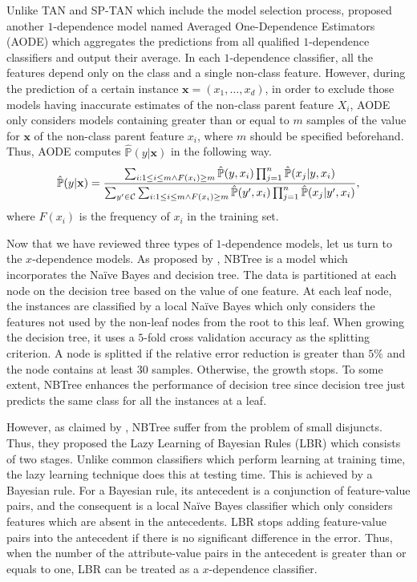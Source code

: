 \documentclass[twoside,11pt]{article}
\begin{document}
Unlike TAN and SP-TAN which include the model selection process, \citet{webb2005not} proposed another $1$-dependence model named Averaged One-Dependence Estimators (AODE) which aggregates the predictions from all qualified $1$-dependence classifiers and output their average. In each $1$-dependence classifier, all the features depend only on the class and a single non-class feature. However, during the prediction of a certain instance $\mathbf{x}=(x_1,\dots,x_d)$, in order to exclude those models having inaccurate estimates of the non-class parent feature $X_i$, AODE only considers models containing greater than or equal to $m$ samples of the value for $\mathbf{x}$ of the non-class parent feature $x_i$, where $m$ should be specified beforehand. Thus, AODE computes $\hat{\mathbb{P}}(y|\mathbf{x})$ in the following way.
\begin{equation*}
    \centering
    \hat{\mathbb{P}}(y|\mathbf{x})=\frac{\sum_{i:1\leq i\leq m\wedge F(x_i)\geq m}\hat{\mathbb{P}}(y,x_i)\prod_{j=1}^{n}\hat{\mathbb{P}}(x_j|y,x_i)}{\sum_{y'\in\mathcal{C}}\sum_{i:1\leq i\leq m\wedge F(x_i)\geq m}\hat{\mathbb{P}}(y',x_i)\prod_{j=1}^{n}\hat{\mathbb{P}}(x_j|y',x_i)},
\end{equation*}
where $F(x_i)$ is the frequency of $x_i$ in the training set.

Now that we have reviewed three types of $1$-dependence models, let us turn to the $x$-dependence models. As proposed by \citet{kohavi1996scaling}, NBTree is a model which incorporates the Na\"ive Bayes and decision tree. The data is partitioned at each node on the decision tree based on the value of one feature. At each leaf node, the instances are classified by a local Na\"ive Bayes which only considers the features not used by the non-leaf nodes from the root to this leaf. When growing the decision tree, it uses a $5$-fold cross validation accuracy as the splitting criterion. A node is splitted if the relative error reduction is greater than $5\%$ and the node contains at least $30$ samples. Otherwise, the growth stops. To some extent, NBTree enhances the performance of decision tree since decision tree just predicts the same class for all the instances at a leaf.

However, as claimed by \citet{zheng2000lazy}, NBTree suffer from the problem of small disjuncts. Thus, they proposed the Lazy Learning of Bayesian Rules (LBR) which consists of two stages. Unlike common classifiers which perform learning at training time, the lazy learning technique does this at testing time. This is achieved by a Bayesian rule. For a Bayesian rule, its antecedent is a conjunction of feature-value pairs, and the consequent is a local Na\"ive Bayes classifier which only considers features which are absent in the antecedents. LBR stops adding feature-value pairs into the antecedent if there is no significant difference in the error. Thus, when the number of the attribute-value pairs in the antecedent is greater than or equals to one, LBR can be treated as a $x$-dependence classifier. 
\end{document}
